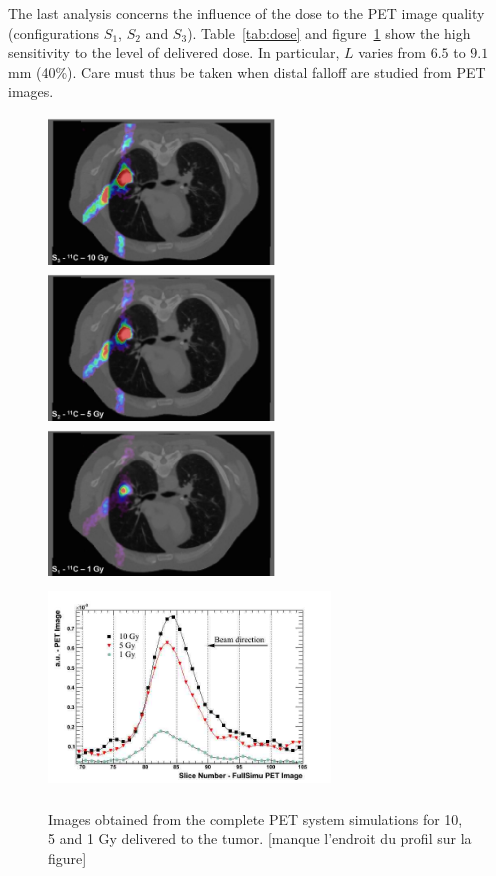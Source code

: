 \documentclass[11pt]{iopart}
\newcommand{\dsnote}[1]{{\color{green}[#1]}}
\newcommand{\sjnote}[1]{{\color{red}[#1]}}
\begin{document}
The last analysis concerns the influence of the dose to the PET image
quality (configurations $S_{1}$, $S_{2}$ and
$S_{3}$). Table~\ref{tab:dose} and figure~\ref{fig:fig5} show the high
sensitivity to the level of delivered dose. In particular, $L$ varies
from $6.5$ to $9.1$ mm (40\%). Care must thus be taken when distal
falloff are studied from PET images.


\begin{figure}[!h]
  \begin{center}
  \includegraphics[width=6cm,height=40mm]{figures/C11_10Gy_v1.jpg}
  \includegraphics[width=6cm,height=40mm]{figures/C11_5Gy_v1.jpg}
  \includegraphics[width=6cm,height=40mm]{figures/C11_1Gy_v1.jpg}
  \includegraphics[width=75mm,height=55mm]{figures/10-5-1-Gy.jpg}
  \caption{Images obtained from the complete PET system simulations
    for 10, 5 and 1 Gy delivered to the tumor. \dsnote{manque
      l'endroit du profil sur la figure}}
  \end{center}
  \label{fig:fig5}
\end{figure}
\end{document}
